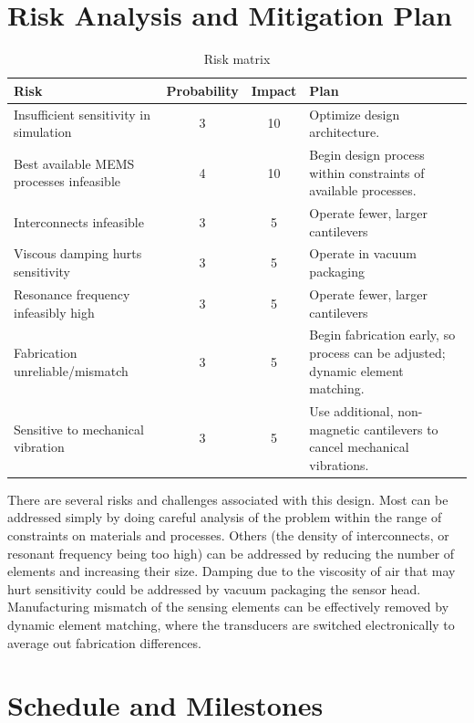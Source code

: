 \section{Risk Analysis and Mitigation Plan}

\begin{table}[h!]
\centering
\begin{tabularx}{.85\textwidth}{|X||c|c|X|}
    \hline
    Risk & Probability & Impact & Plan\\
    \hline
    \hline
    Insufficient sensitivity in simulation & 3 & 10 & Optimize design architecture. \\
    \hline
    Best available MEMS processes infeasible & 4 & 10 & Begin design process within constraints of available processes. \\
    \hline
    Interconnects infeasible & 3 & 5 & Operate fewer, larger cantilevers \\
    \hline
    Viscous damping hurts sensitivity & 3 & 5 & Operate in vacuum packaging \\
    \hline
    Resonance frequency infeasibly high & 3  & 5 & Operate fewer, larger cantilevers \\
    \hline
    Fabrication unreliable/mismatch & 3 & 5 & Begin fabrication early, so process can be adjusted; dynamic element matching. \\
    \hline
    Sensitive to mechanical vibration & 3 & 5 & Use additional, non-magnetic cantilevers to cancel mechanical vibrations. \\
    \hline
\end{tabularx}
\caption{Risk matrix}
\label{table:risk}
\end{table}

There are several risks and challenges associated with this design. Most can be addressed simply by doing careful analysis of the problem within the range of constraints on materials and processes. Others (the density of interconnects, or resonant frequency being too high) can be addressed by reducing the number of elements and increasing their size. Damping due to the viscosity of air that may hurt sensitivity could be addressed by vacuum packaging the sensor head. Manufacturing mismatch of the sensing elements can be effectively removed by dynamic element matching, where the transducers are switched electronically to average out fabrication differences.

\section{Schedule and Milestones}


